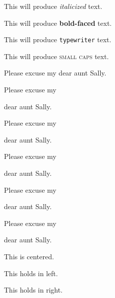 \documentclass[11pt]{article}
\begin{document}
This will produce \textit{italicized} text.

This will produce \textbf{bold-faced} text.

This will produce \texttt{typewriter} text.

This will produce \textsc{small caps} text.

Please excuse my dear aunt Sally.

Please excuse my \begin{large}dear aunt Sally.\end{large}

Please excuse my \begin{Large}dear aunt Sally.\end{Large}

Please excuse my \begin{huge}dear aunt Sally.\end{huge}

Please excuse my \begin{Huge}dear aunt Sally.\end{Huge}

Please excuse my \begin{small}dear aunt Sally.\end{small}

\begin{center}
This is centered.
\end{center}

\begin{flushleft}
This holds in left.
\end{flushleft}

\begin{flushright}
This holds in right.
\end{flushright}
\end{document}
